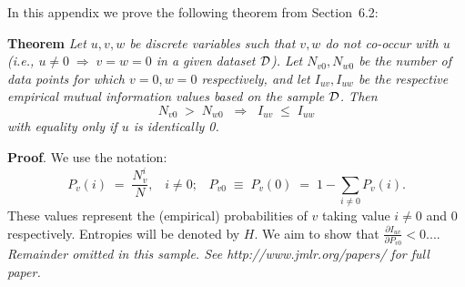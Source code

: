 \documentclass[twoside,11pt]{report}
\newcommand{\dataset}{{\cal D}}
\newcommand{\fracpartial}[2]{\frac{\partial #1}{\partial  #2}}
\begin{document}

In this appendix we prove the following theorem from
Section~6.2:

\noindent
{\bf Theorem} {\it Let $u,v,w$ be discrete variables such that $v, w$ do
not co-occur with $u$ (i.e., $u\neq0\;\Rightarrow \;v=w=0$ in a given
dataset $\dataset$). Let $N_{v0},N_{w0}$ be the number of data points for
which $v=0, w=0$ respectively, and let $I_{uv},I_{uw}$ be the
respective empirical mutual information values based on the sample
$\dataset$. Then
\[
	N_{v0} \;>\; N_{w0}\;\;\Rightarrow\;\;I_{uv} \;\leq\;I_{uw}
\]
with equality only if $u$ is identically 0.} \hfill\BlackBox

\noindent
{\bf Proof}. We use the notation:
\[
P_v(i) \;=\;\frac{N_v^i}{N},\;\;\;i \neq 0;\;\;\;
P_{v0}\;\equiv\;P_v(0)\; = \;1 - \sum_{i\neq 0}P_v(i).
\]
These values represent the (empirical) probabilities of $v$
taking value $i\neq 0$ and 0 respectively.  Entropies will be denoted
by $H$. We aim to show that $\fracpartial{I_{uv}}{P_{v0}} < 0$....\\

{\noindent \em Remainder omitted in this sample. See http://www.jmlr.org/papers/ for full paper.}


\vskip 0.2in

% 

\end{document}

